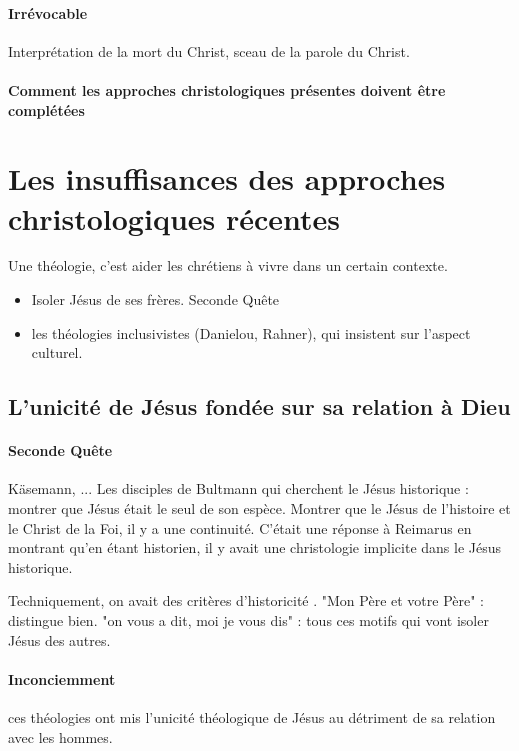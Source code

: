 \paragraph{Irrévocable} Interprétation de la mort du Christ, sceau de la parole du Christ. 

\paragraph{Comment les approches christologiques présentes doivent être complétées}
\section{Les insuffisances des approches christologiques récentes}

Une théologie, c'est aider les chrétiens à vivre dans un certain contexte. 

\begin{itemize}
    \item Isoler Jésus de ses frères. Seconde Quête
    \item les théologies inclusivistes (Danielou, Rahner), qui insistent sur l'aspect culturel.
\end{itemize}
\subsection{L’unicité de Jésus fondée sur sa relation à Dieu}

\paragraph{Seconde Quête} Käsemann, ... Les disciples de Bultmann qui cherchent le Jésus historique : montrer que Jésus était le seul de son espèce. Montrer que le Jésus de l'histoire et le Christ de la Foi, il y a une continuité. C'était une réponse à Reimarus en montrant qu'en étant historien, il y avait une christologie implicite dans le Jésus historique. 

Techniquement, on avait des critères d'historicité . "Mon Père et votre Père" : distingue bien. "on vous a dit, moi je vous dis" : tous ces motifs qui vont isoler Jésus des autres.

\paragraph{Inconciemment} ces théologies ont mis l'unicité théologique de Jésus au détriment de sa relation avec les hommes.



